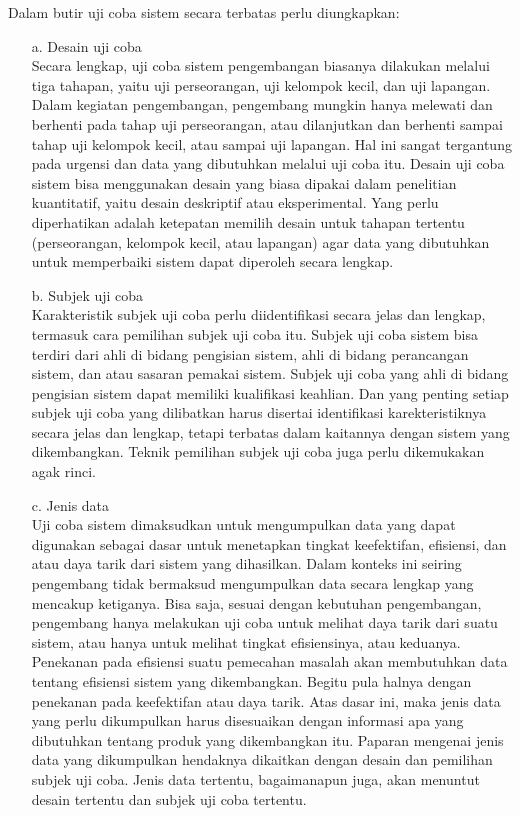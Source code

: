 \documentclass{jtetiproposalskripsi}
\begin{document}
Dalam butir uji coba sistem secara terbatas perlu diungkapkan:
\begin{itemize} 
\item[a.] Desain uji coba\\
Secara lengkap, uji coba sistem pengembangan biasanya dilakukan melalui tiga tahapan, yaitu uji perseorangan, uji kelompok kecil, dan uji lapangan. Dalam kegiatan pengembangan, pengembang mungkin  hanya melewati dan berhenti pada tahap uji perseorangan, atau dilanjutkan dan berhenti sampai tahap uji kelompok kecil, atau sampai uji lapangan. Hal ini sangat tergantung pada urgensi dan data yang dibutuhkan melalui uji coba itu. Desain uji coba sistem bisa menggunakan desain yang biasa dipakai dalam penelitian kuantitatif, yaitu desain deskriptif atau eksperimental. Yang perlu diperhatikan adalah ketepatan memilih desain untuk tahapan tertentu (perseorangan, kelompok kecil, atau lapangan) agar data yang dibutuhkan untuk memperbaiki sistem dapat diperoleh secara lengkap. 
\item[b.] Subjek uji coba \\
Karakteristik subjek uji coba perlu diidentifikasi secara jelas dan lengkap, termasuk cara pemilihan subjek uji coba itu. Subjek uji coba sistem bisa terdiri dari ahli di bidang pengisian sistem, ahli di bidang perancangan sistem, dan atau sasaran pemakai sistem. Subjek uji coba yang ahli di bidang pengisian sistem dapat memiliki kualifikasi keahlian. Dan yang penting setiap subjek uji coba yang dilibatkan harus disertai identifikasi karekteristiknya secara jelas dan lengkap, tetapi terbatas dalam kaitannya dengan sistem yang dikembangkan. Teknik pemilihan subjek uji coba juga perlu dikemukakan agak rinci. 
\item[c.] Jenis data  \\
Uji coba sistem dimaksudkan untuk mengumpulkan data yang dapat digunakan sebagai dasar untuk menetapkan tingkat keefektifan, efisiensi, dan atau daya tarik dari sistem yang dihasilkan. Dalam konteks ini seiring pengembang tidak bermaksud mengumpulkan data secara lengkap yang  mencakup ketiganya. Bisa saja, sesuai dengan kebutuhan pengembangan, pengembang hanya melakukan uji coba untuk melihat daya tarik dari suatu sistem, atau hanya untuk melihat tingkat efisiensinya, atau keduanya. Penekanan pada efisiensi suatu pemecahan masalah akan membutuhkan data tentang efisiensi sistem yang  dikembangkan. Begitu pula halnya dengan penekanan pada keefektifan atau daya tarik. Atas dasar ini, maka jenis data yang perlu dikumpulkan harus disesuaikan dengan informasi apa yang dibutuhkan tentang produk yang dikembangkan itu. Paparan mengenai jenis data yang dikumpulkan hendaknya dikaitkan dengan desain dan pemilihan subjek uji coba. Jenis data tertentu, bagaimanapun juga, akan menuntut desain tertentu dan subjek uji coba tertentu.

\end{itemize}
\end{document}
